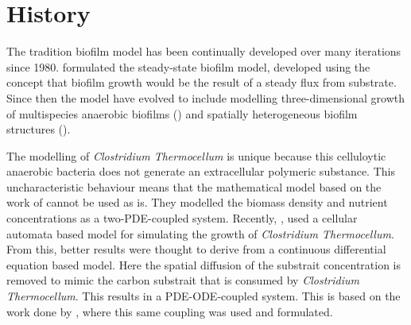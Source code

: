 \section{History}


The tradition biofilm model has been continually developed over many iterations since 1980.
\cite{rittmann1980model} formulated the steady-state biofilm model, developed using the concept that biofilm growth would be the result of a steady flux from substrate.
Since then the model have evolved to include modelling three-dimensional growth of multispecies anaerobic biofilms (\cite{noguera1999simulation}) and spatially heterogeneous biofilm structures (\cite{eberl2001deterministic}). 

The modelling of \textit{Clostridium Thermocellum} is unique because this celluloytic anaerobic bacteria does not generate an extracellular polymeric substance.
This uncharacteristic behaviour means that the mathematical model based on the work of \cite{eberl2007finite} cannot be used as is. 
They modelled the biomass density and nutrient concentrations as a two-PDE-coupled system.
Recently, \cite{wang2011spatial}, used a cellular automata based model for simulating the growth of \textit{Clostridium Thermocellum}. From this, better results were thought to derive from a continuous differential equation based model.
Here the spatial diffusion of the substrait concentration is removed to mimic the carbon substrait that is consumed by \textit{Clostridium Thermocellum}. This results in a PDE-ODE-coupled system.
This is based on the work done by \cite{dumitrache2014understanding}, where this same coupling was used and formulated.
